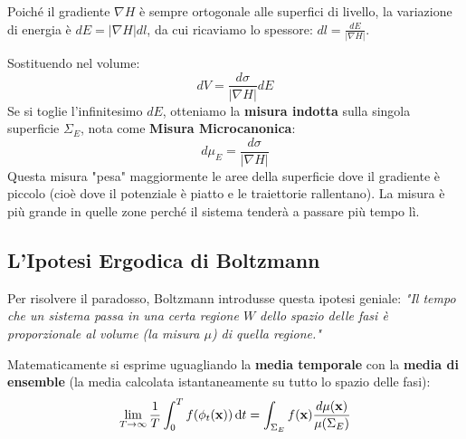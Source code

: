 \documentclass[openany]{book}
\theoremstyle{definition}
\theoremstyle{remark}
\begin{document}
\begin{figure}
\vspace{-20pt}
\begin{center}
\end{center}
\vspace{-20pt}
\end{figure}

Poiché il gradiente $\nabla H$ è sempre ortogonale alle superfici di livello, la variazione di energia è $dE = |\nabla H| dl$, da cui ricaviamo lo spessore: $dl = \frac{dE}{|\nabla H|}$.

Sostituendo nel volume:
\begin{equation*}
    dV = \frac{d\sigma}{|\nabla H|} dE
\end{equation*}
Se si toglie l'infinitesimo $dE$, otteniamo la \textbf{misura indotta} sulla singola superficie $\Sigma_E$, nota come \textbf{Misura Microcanonica}:
\begin{equation}
    d\mu_E = \frac{d\sigma}{|\nabla H|}
\end{equation}
Questa misura "pesa" maggiormente le aree della superficie dove il gradiente è piccolo (cioè dove il potenziale è piatto e le traiettorie rallentano). La misura è più grande in quelle zone perché il sistema tenderà a passare più tempo lì.

\subsection*{L'Ipotesi Ergodica di Boltzmann}
Per risolvere il paradosso, Boltzmann introdusse questa ipotesi geniale:
\textit{"Il tempo che un sistema passa in una certa regione $W$ dello spazio delle fasi è proporzionale al volume (la misura $\mu$) di quella regione."}

Matematicamente si esprime uguagliando la \textbf{media temporale} con la \textbf{media di ensemble} (la media calcolata istantaneamente su tutto lo spazio delle fasi):
\begin{equation}
    \lim_{T \to \infty} \frac{1}{T} \int_0^T f(\phi_t(\vb{x})) \dd{t} = \int_{\Sigma_E} f(\vb{x}) \frac{d\mu(\vb{x})}{\mu(\Sigma_E)}
\end{equation}
\end{document}
